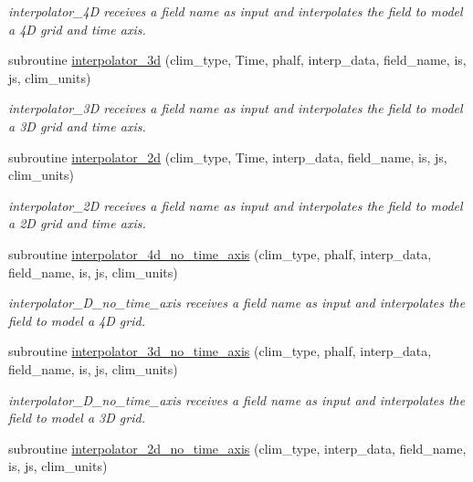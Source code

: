 \begin{DoxyCompactItemize}
\begin{DoxyCompactList}\small\item\em interpolator\+\_\+4D receives a field name as input and interpolates the field to model a 4D grid and time axis. \end{DoxyCompactList}\item 
subroutine \hyperlink{namespaceinterpolator__mod_ab04eaf1ed57ea3a211ee4f99a3485ab3}{interpolator\+\_\+3d} (clim\+\_\+type, Time, phalf, interp\+\_\+data, field\+\_\+name, is, js, clim\+\_\+units)
\begin{DoxyCompactList}\small\item\em interpolator\+\_\+3D receives a field name as input and interpolates the field to model a 3D grid and time axis. \end{DoxyCompactList}\item 
subroutine \hyperlink{namespaceinterpolator__mod_a55df96af3f7f130686daf079e95f248a}{interpolator\+\_\+2d} (clim\+\_\+type, Time, interp\+\_\+data, field\+\_\+name, is, js, clim\+\_\+units)
\begin{DoxyCompactList}\small\item\em interpolator\+\_\+2D receives a field name as input and interpolates the field to model a 2D grid and time axis. \end{DoxyCompactList}\item 
subroutine \hyperlink{namespaceinterpolator__mod_afe3e54b412fafba9458282b5982be15a}{interpolator\+\_\+4d\+\_\+no\+\_\+time\+\_\+axis} (clim\+\_\+type, phalf, interp\+\_\+data, field\+\_\+name, is, js, clim\+\_\+units)
\begin{DoxyCompactList}\small\item\em interpolator\+\_\+D\+\_\+no\+\_\+time\+\_\+axis receives a field name as input and interpolates the field to model a 4D grid. \end{DoxyCompactList}\item 
subroutine \hyperlink{namespaceinterpolator__mod_aeb3700c595f4ad78698cd2905b4de9e0}{interpolator\+\_\+3d\+\_\+no\+\_\+time\+\_\+axis} (clim\+\_\+type, phalf, interp\+\_\+data, field\+\_\+name, is, js, clim\+\_\+units)
\begin{DoxyCompactList}\small\item\em interpolator\+\_\+D\+\_\+no\+\_\+time\+\_\+axis receives a field name as input and interpolates the field to model a 3D grid. \end{DoxyCompactList}\item 
subroutine \hyperlink{namespaceinterpolator__mod_a0085bbfdd9a3d3d9d267f3e9f93b52e7}{interpolator\+\_\+2d\+\_\+no\+\_\+time\+\_\+axis} (clim\+\_\+type, interp\+\_\+data, field\+\_\+name, is, js, clim\+\_\+units)

\end{DoxyCompactItemize}
